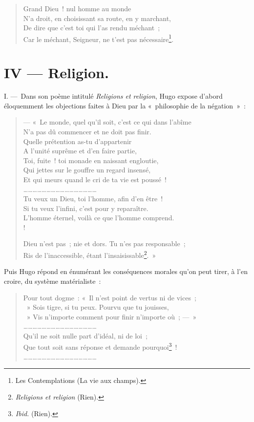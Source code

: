 \documentclass[french,twoside]{book} %
\begin{document}
\begin{verse}
Grand Dieu ! nul homme au monde\\
N’a droit, en choisissant sa route, en y marchant,\\
De dire que c’est toi qui l’as rendu méchant ;\\
Car le méchant, Seigneur, ne t’est pas nécessaire\footnote{Les Contemplations (La vie aux champs).}.\\
\end{verse}

\section[{IV — Religion.}]{IV — Religion.}
\noindent I. — Dans son poème intitulé \emph{Religions et religion}, Hugo expose d’abord éloquemment les objections faites à Dieu par la « philosophie de la négation » :\par


\begin{verse}
— « Le monde, quel qu’il soit, c’est ce qui dans l’abîme\\
N’a pas dû commencer et ne doit pas finir.\\
Quelle prétention as-tu d’appartenir\\
A l’unité suprême et d’en faire partie,\\
Toi, fuite ! toi monade en naissant engloutie,\\
Qui jettes sur le gouffre un regard insensé,\\
Et qui meurs quand le cri de ta vie est poussé !\\
…………………………………………\\
 Tu veux un Dieu, toi l’homme, afin d’en être !\\
Si tu veux l’infini, c’est pour y reparaître.\\
L’homme éternel, voilà ce que l’homme comprend.\\!

Dieu n’est pas ; nie et dors. Tu n’es pas responsable ;\\
Ris de l’inaccessible, étant l’insaisissable\footnote{\emph{Religions et religion} (Rien).}. »\\
\end{verse}

\noindent Puis Hugo répond en énumérant les conséquences morales qu’on peut tirer, à l’en croire, du système matérialiste :\par


\begin{verse}
Pour tout dogme : « Il n’est point de vertus ni de vices ;\\
 » Sois tigre, si tu peux. Pourvu que tu jouisses,\\
 » Vis n’importe comment pour finir n’importe où ; — »\\
…………………………………………\\
Qu’il ne soit nulle part d’idéal, ni de loi ;\\
Que tout soit sans réponse et demande pourquoi\footnote{\emph{Ibid.} (Rien).} !\\
…………………………………………\\
\end{verse}
\end{document}
